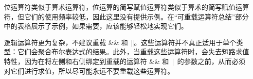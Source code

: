位运算符类似于算术运算符，位运算的简写赋值运算符类似于算术的简写赋值运算符，但它们的使用频率较低，因此这里没有提供示例。在“可重载运算符总结”部分中的表格展示了示例，如果需要，应该能够轻松地实现它们。

逻辑运算符更为复杂，不建议重载 \&\& 和 ||。这些运算符并不真正适用于单个类型：它们会聚合布尔表达式的结果。此外，当重载这些运算符时，会失去短路求值特性，因为在将左侧和右侧绑定到重载的运算符 \&\& 和 || 的参数之前，从而必须对它们进行求值，所以尽可能永远不要重载这些运算符。
